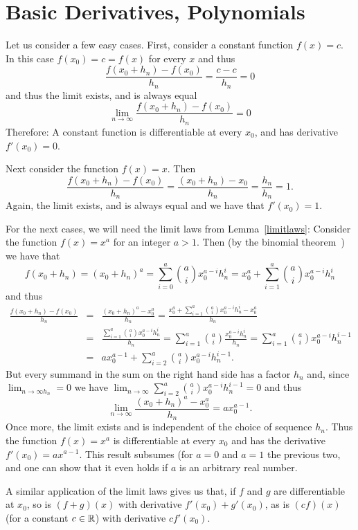 \section{Basic Derivatives, Polynomials}
\label{secderpol}

Let us consider a few easy cases. First, consider a constant function
$f(x)=c$. In this case $f(x_0)=c=f(x)$ for every $x$ and thus
\[
\frac{f(x_0+h_n)-f(x_0)}{h_n} =\frac{c-c}{h_n}=0
\]
and thus the limit exists, and is always equal
\[
\lim_{n\to\infty} \frac{f(x_0+h_n)-f(x_0)}{h_n}=0
\]
Therefore: A constant function is differentiable at every $x_0$, and has
derivative $f'(x_0)=0$.

Next consider the function $f(x)=x$. Then
\[
\frac{f(x_0+h_n)-f(x_0)}{h_n} =\frac{(x_0+h_n)-x_0}{h_n}=\frac{h_n}{h_n}=1.
\]
Again, the limit exists, and is always equal and we have that
$f'(x_0)=1$.

For the next cases, we will need the limit laws from
Lemma~\ref{limitlaws}: Consider the function $f(x)=x^a$ for an integer
$a>1$. Then (by the binomial theorem~) we
have that 
\[
f(x_0+h_n)=(x_0+h_n)^a=\sum_{i=0}^a {a\choose i} x_0^{a-i} h_n^i
=x_0^a+\sum_{i=1}^{a} {a\choose i} x_0^{a-i} h_n^i
\]
and thus
\begin{eqnarray*}
\frac{f(x_0+h_n)-f(x_0)}{h_n}&=&\frac{(x_0+h_n)^a-x_0^a}{h_n}
=\frac{x_0^a+\sum_{i=1}^{a} {a\choose i} x_0^{a-i} h_n^i-x_0^a}{h_n}\\
&=&\frac{\sum_{i=1}^{a} {a\choose i} x_0^{a-i} h_n^{i}}{h_n}
=\sum_{i=1}^{a} {a\choose i} \frac{x_0^{a-i} h_n^{i}}{h_n}
=\sum_{i=1}^{a} {a\choose i} x_0^{a-i} h_n^{i-1}\\
&=&a x_0^{a-1}+\sum_{i=2}^a{a\choose i} x_0^{a-i} h_n^{i-1}.
\end{eqnarray*}
But every summand in the sum on the right hand side has a factor $h_n$ and,
since $\lim_{n\to\infty h_n}=0$ we have 
$\lim_{n\to\infty}\sum_{i=2}^a{a\choose i} x_0^{a-i} h_n^{i-1}=0$ and thus
\[
\lim_{n\to\infty}\frac{(x_0+h_n)^a-x_0^a}{h_n}=a x_0^{a-1}.
\]
Once more, the limit exists and is independent of the choice of sequence
$h_n$. Thus the function $f(x)=x^a$ is differentiable at every $x_0$ and has
the derivative $f'(x_0)=a x^{a-1}$. This result subsumes (for $a=0$ and
$a=1$ the previous two, and one can show that it even holds if $a$ is an
arbitrary real number.
\smallskip

A similar application of the limit laws gives us that, if $f$ and $g$ are
differentiable at $x_0$, so is  $(f+g)(x)$ with derivative
$f'(x_0)+g'(x_0)$, as is $(cf)(x)$ (for a constant $c\in{\mathbb R}$) with derivative
$cf'(x_0)$.
\smallskip

